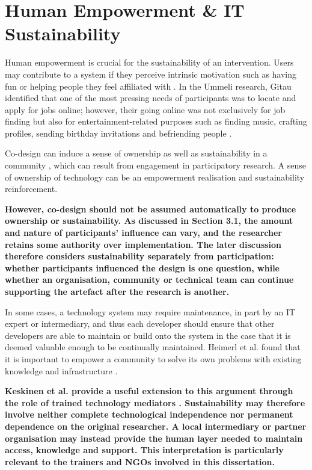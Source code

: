 \section{Human Empowerment \& IT Sustainability}

Human empowerment is crucial for the sustainability of an intervention. Users may contribute to a system if they perceive intrinsic motivation such as having fun or helping people they feel affiliated with \cite{zimmerman2011}. In the Ummeli research, Gitau identified that one of the most pressing needs of participants was to locate and apply for jobs online; however, their going online was not exclusively for job finding but also for entertainment-related purposes such as finding music, crafting profiles, sending birthday invitations and befriending people \cite{gitau2012}.

Co-design can induce a sense of ownership as well as sustainability in a community \cite{david2013}, which can result from engagement in participatory research. A sense of ownership of technology can be an empowerment realisation and sustainability reinforcement.

\textbf{However, co-design should not be assumed automatically to produce ownership or sustainability. As discussed in Section 3.1, the amount and nature of participants' influence can vary, and the researcher retains some authority over implementation. The later discussion therefore considers sustainability separately from participation: whether participants influenced the design is one question, while whether an organisation, community or technical team can continue supporting the artefact after the research is another.}

In some cases, a technology system may require maintenance, in part by an IT expert or intermediary, and thus each developer should ensure that other developers are able to maintain or build onto the system in the case that it is deemed valuable enough to be continually maintained. Heimerl et al. found that it is important to empower a community to solve its own problems with existing knowledge and infrastructure \cite{heimerl2015}.

\textbf{Keskinen et al. provide a useful extension to this argument through the role of trained technology mediators \cite{keskinen2022}. Sustainability may therefore involve neither complete technological independence nor permanent dependence on the original researcher. A local intermediary or partner organisation may instead provide the human layer needed to maintain access, knowledge and support. This interpretation is particularly relevant to the trainers and NGOs involved in this dissertation.}

